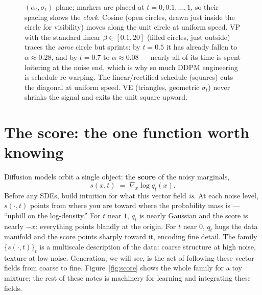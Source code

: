 \documentclass[10pt,a4paper]{article}
\newcommand{\score}{s}
\begin{document}
\begin{figure}[t]
{$(\alpha_t, \sigma_t)$ plane; markers are placed at
$t = 0, 0.1, \ldots, 1$, so their spacing shows the \emph{clock}. Cosine
(open circles, drawn just inside the circle for visibility) moves along the
unit circle at uniform speed. VP with the standard linear
$\beta \in [0.1, 20]$ (filled circles, just outside) traces the \emph{same}
circle but sprints: by $t = 0.5$ it has already fallen to
$\alpha \approx 0.28$, and by $t = 0.7$ to $\alpha \approx 0.08$ ---
nearly all of its time is spent loitering at the
noise end, which is why so much DDPM engineering is schedule
re-warping. The linear/rectified schedule (squares) cuts the diagonal at
uniform speed. VE (triangles, geometric $\sigma_t$) never shrinks the
signal and exits the unit square upward.}
\label{fig:schedules}
\end{figure}

\section{The score: the one function worth knowing}
\label{sec:score}

Diffusion models orbit a single object: the \textbf{score} of the noisy
marginals,
\begin{equation}
\score(x, t) \;=\; \nabla_x \log q_t(x).
\end{equation}
Before any SDEs, build intuition for what this vector field \emph{is}. At
each noise level, $\score(\cdot, t)$ points from where you are toward where
the probability mass is --- ``uphill on the log-density.'' For $t$ near
$1$, $q_t$ is nearly Gaussian and the score is nearly $-x$: everything
points blandly at the origin. For $t$ near $0$, $q_t$ hugs the data
manifold and the score points sharply toward it, encoding fine detail. The
family $\{\score(\cdot, t)\}_t$ is a multiscale description of the data:
coarse structure at high noise, texture at low noise. Generation, we will
see, is the act of following these vector fields from coarse to fine.
Figure~\ref{fig:score} shows the whole family for a toy mixture; the
rest of these notes is machinery for learning and integrating these
fields.
\end{document}
